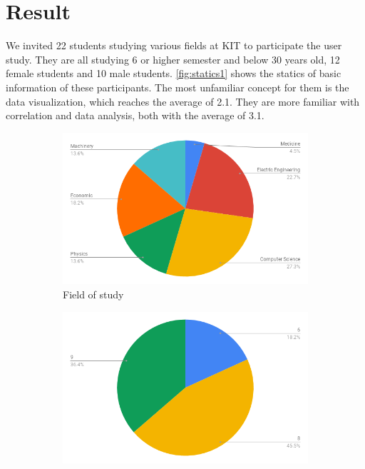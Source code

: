 \section{Result}
\label{sec:Evaluation:Result}
We invited 22 students studying various fields at KIT to participate the user study. They are all studying 6 or higher semester and below 30 years old, 12 female students and 10 male students. \autoref{fig:statics1} shows the statics of basic information of these participants. The most unfamiliar concept for them is the data visualization, which reaches the average of 2.1. They are more familiar with correlation and data analysis, both with the average of 3.1.
\begin{figure}[h]
	\centering
	\begin{subfigure}[b]{0.48\textwidth}
		\centering
		\includegraphics[width=\textwidth]{pictures/q11}
		\caption{Field of study}
	\end{subfigure}
	\hfill
	\begin{subfigure}[b]{0.48\textwidth}
		\centering
		\includegraphics[width=\textwidth]{pictures/q12}

\end{subfigure}
\end{figure}
